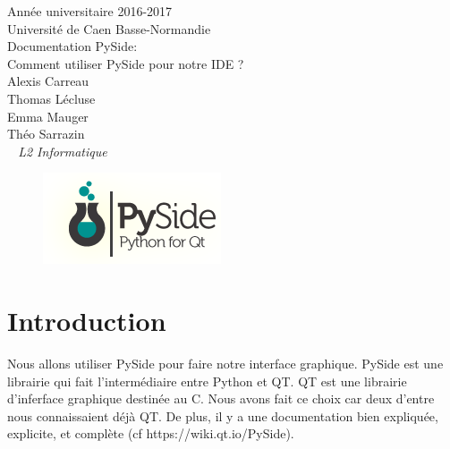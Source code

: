 \documentclass[a4paper,12pt]{article}
\begin{document}
\begin{titlepage}
	\begin{center}
		\Large{Année universitaire 2016-2017}\\
		\Large{Université de Caen Basse-Normandie}\\[1cm]
		
		\huge{Documentation PySide:}\\
		Comment utiliser PySide pour notre IDE ?\\
		\vspace{3cm}
		Alexis Carreau\\
		Thomas Lécluse\\
		Emma Mauger\\
		Théo Sarrazin\\
	\normalsize{\textit{ ~ L2 Informatique}}\\
		\medskip
		\vspace{3cm}

	\begin{figure}[!h]

			\begin{center}

				\includegraphics[scale=1.5]{"images/pysidelogo"}

			\end{center}

		\end{figure}
		
	\end{center}
\end{titlepage}


\tableofcontents

\newpage

\section{Introduction}

Nous allons utiliser PySide pour faire notre interface graphique. PySide est une librairie qui fait l'intermédiaire entre Python et QT. QT est une librairie d'inferface graphique destinée au C. Nous avons fait ce choix car deux d'entre nous connaissaient déjà QT. De plus, il y a une documentation bien expliquée, explicite, et complète (cf https://wiki.qt.io/PySide). 
\end{document}
